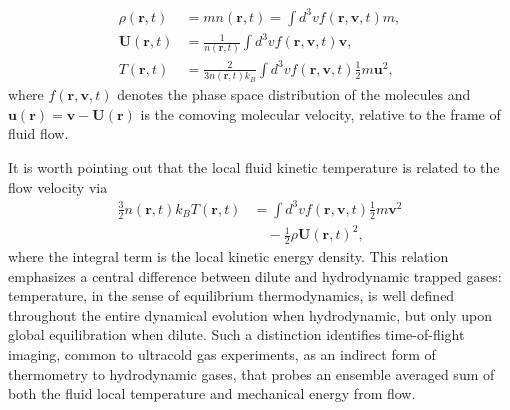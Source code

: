 \documentclass[reprint, amsmath, amssymb, aps, superscriptaddress]{revtex4-1}
\begin{document}
\begin{subequations}
\begin{align}
    \rho(\boldsymbol{r}, t) 
    &= 
    m n(\boldsymbol{r}, t) = \int d^3 v f(\boldsymbol{r}, \boldsymbol{v}, t) m, \\
    \boldsymbol{U}(\boldsymbol{r}, t) 
    &= 
    \frac{1}{n(\boldsymbol{r}, t)} \int d^3 v f(\boldsymbol{r}, \boldsymbol{v}, t) \boldsymbol{v}, \\
    T(\boldsymbol{r}, t) 
    &= 
    \frac{ 2 }{ 3 n(\boldsymbol{r}, t) k_B } \int d^3 v f(\boldsymbol{r}, \boldsymbol{v}, t) \frac{1}{2} m \boldsymbol{u}^2, \label{eq:local_temperature}
\end{align}
\end{subequations}
where $f(\boldsymbol{r}, \boldsymbol{v}, t)$ denotes the phase space distribution of the molecules and $\boldsymbol{u}(\boldsymbol{r}) = \boldsymbol{v} - \boldsymbol{U}(\boldsymbol{r})$ is the comoving molecular velocity, relative to the frame of fluid flow. 

It is worth pointing out that the local fluid kinetic temperature is related to the flow velocity via
\begin{align} \label{eq:T_vs_U}
    \frac{ 3 }{ 2 }
    n(\boldsymbol{r}, t) k_B T(\boldsymbol{r}, t)
    &=
    \int d^3 v f(\boldsymbol{r}, \boldsymbol{v}, t) \frac{ 1 }{ 2 } m \boldsymbol{v}^2 \nonumber\\
    &\quad -
    \frac{ 1 }{ 2 } \rho \boldsymbol{U}(\boldsymbol{r}, t)^2,
\end{align}
where the integral term is the local kinetic energy density. 
This relation emphasizes a central difference between dilute and hydrodynamic trapped gases: temperature, in the sense of equilibrium thermodynamics, is well defined throughout the entire dynamical evolution when hydrodynamic, but only upon global equilibration when dilute. Such a distinction identifies time-of-flight imaging, common to ultracold gas experiments, as an indirect form of thermometry to hydrodynamic gases, that probes an ensemble averaged sum of both the fluid local temperature and mechanical energy from flow. 
\end{document}
